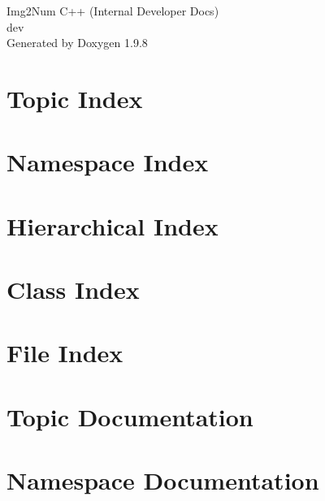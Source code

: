 \documentclass[twoside]{book}
\newcommand{\+}{\discretionary{\mbox{\scriptsize$\hookleftarrow$}}{}{}}
\newcommand{\clearemptydoublepage}{%
    \newpage{\pagestyle{empty}\cleardoublepage}%
  }
\begin{document}
  \raggedbottom
    \hypersetup{pageanchor=false,
                bookmarksnumbered=true,
                pdfencoding=unicode
               }
  \begin{titlepage}
  \vspace*{7cm}
  \begin{center}%
  {\Large Img2\+Num C++ (\+Internal Developer Docs)}\\
  [1ex]\large dev \\
  \vspace*{1cm}
  {\large Generated by Doxygen 1.9.8}\\
  \end{center}
  \end{titlepage}
  \clearemptydoublepage
  \tableofcontents
  \clearemptydoublepage
  \hypersetup{pageanchor=true}

\chapter{Topic Index}

\chapter{Namespace Index}

\chapter{Hierarchical Index}

\chapter{Class Index}

\chapter{File Index}

\chapter{Topic Documentation}

\chapter{Namespace Documentation}


\end{document}
